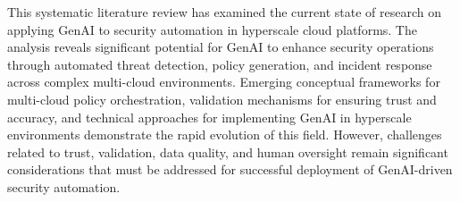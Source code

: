 This systematic literature review has examined the current state of research on applying GenAI to security automation in hyperscale cloud platforms. The analysis reveals significant potential for GenAI to enhance security operations through automated threat detection, policy generation, and incident response across complex multi-cloud environments.
Emerging conceptual frameworks for multi-cloud policy orchestration, validation mechanisms for ensuring trust and accuracy, and technical approaches for implementing GenAI in hyperscale environments demonstrate the rapid evolution of this field. However, challenges related to trust, validation, data quality, and human oversight remain significant considerations that must be addressed for successful deployment of GenAI-driven security automation.




